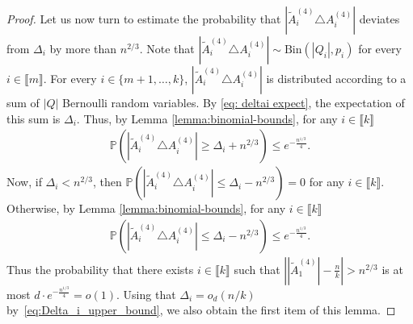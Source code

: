 \documentclass[notitlepage]{scrartcl}
\newcommand{\br}[1]{\llbracket{#1}\rrbracket}
\begin{document}
\begin{proof}
Let us now turn to estimate the probability that $\left|\tilde{A}_i^{(4)}\triangle A_i^{(4)}\right|$ deviates from $\Delta_i$ by more than $n^{2/3}$. Note that $\left|\tilde{A}_i^{(4)}\triangle A_i^{(4)}\right|\sim \text{Bin}(|Q_i|,p_i)$ for every $i\in \br{m}$. For every $i\in \{m+1,\ldots,k\}$, $\left|\tilde{A}_i^{(4)}\triangle A_i^{(4)}\right|$ is distributed according to a sum of $|Q|$ Bernoulli random variables. By \eqref{eq: deltai expect}, the expectation of this sum is $\Delta_i$. Thus, by Lemma \ref{lemma:binomial-bounds}, for any $i\in \br{k}$
\begin{align*}
    \mathbb{P}\left(\left|\tilde{A}_i^{(4)}\triangle A_i^{(4)}\right|\ge \Delta_i+n^{2/3}\right)\le e^{-\frac{n^{1/3}}{4}}.
\end{align*}
Now, if $\Delta_i<n^{2/3}$, then $\mathbb{P}\left(\left|\tilde{A}_i^{(4)}\triangle A_i^{(4)}\right|\le \Delta_i-n^{2/3}\right)=0$ for any $i\in \br{k}$. Otherwise, by Lemma \ref{lemma:binomial-bounds}, for any $i\in \br{k}$
\begin{align*}
\mathbb{P}\left(\left|\tilde A_i^{(4)}\triangle A_i^{(4)}\right|\le \Delta_i-n^{2/3}\right)\le e^{-\frac{n^{1/3}}{4}}.
\end{align*}
Thus %
 the probability that there exists $i\in \br{k}$ such that $\left||\tilde A_1^{(4)}|-\frac{n}{k}\right|>n^{2/3}$ is at most $d\cdot e^{-\frac{n^{1/3}}{4}}=o(1)$. Using that $\Delta_i=o_d(n/k)$ by~\eqref{eq:Delta_i_upper_bound}, we also obtain the first item of this lemma.
\end{proof}
\end{document}
